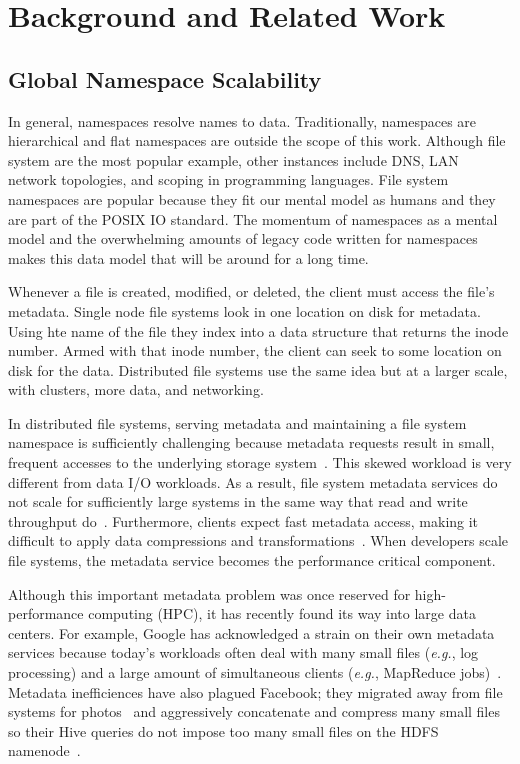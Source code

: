 \chapter{Background and Related Work}
\label{related-work}

\section{Global Namespace Scalability}

In general, namespaces resolve names to data. Traditionally, namespaces are
hierarchical and flat namespaces are outside the scope of this work. Although
file system are the most popular example, other instances include DNS, LAN
network topologies, and scoping in programming languages.  File system
namespaces are popular because they fit our mental model as humans and they are
part of the POSIX IO standard. The momentum of namespaces as a mental model and
the overwhelming amounts of legacy code written for namespaces makes this data
model that will be around for a long time.

Whenever a file is created, modified, or deleted, the client must access the
file's metadata. Single node file systems look in one location on disk for
metadata. Using hte name of the file they index into a data structure that
returns the inode number. Armed with that inode number, the client can seek to
some location on disk for the data. Distributed file systems use the same idea
but at a larger scale, with clusters, more data, and networking.

In distributed file systems, serving metadata and maintaining a file system
namespace is sufficiently challenging because metadata requests result in
small, frequent accesses to the underlying storage
system~\cite{roselli:atec2000-FS-workloads}.  This skewed workload is very
different from data I/O workloads. As a result, file system metadata services
do not scale for sufficiently large systems in the same way that read and write
throughput do~\cite{abad:techreport2012-fstrace, abad:ucc2012-mimesis,
alam:pdsw2011-metadata-scaling, weil:osdi2006-ceph}. Furthermore, clients
expect fast metadata access, making it difficult to apply data compressions and
transformations~\cite{leung:atc2008-nfs-trace}. When developers scale file
systems, the metadata service becomes the performance critical component. 

Although this important metadata problem was once reserved for high-performance
computing (HPC), it has recently found its way into large data centers. For
example, Google has acknowledged a strain on their own metadata services
because today's workloads often deal with many small files ({\it e.g.}, log
processing) and a large amount of simultaneous clients ({\it e.g.}, MapReduce
jobs)~\cite{mckusick:acm2010-gfs-evolution}. Metadata inefficiences have also
plagued Facebook; they migrated away from file systems for
photos~\cite{beaver:osdi2010-haystack} and aggressively concatenate and
compress many small files so their Hive queries do not impose too many small
files on the HDFS namenode~\cite{thusoo:sigmod2010-facebook-infrastructure}. 

